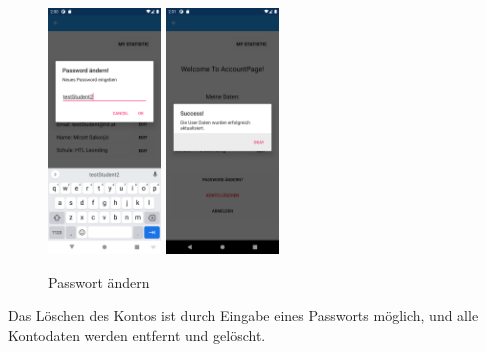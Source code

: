 \begin{figure}[h]
    \begin{center}
    \includegraphics[width=3cm]{pics/Xamarin Student/21.png}\hfill
    \includegraphics[width=3cm]{pics/Xamarin Student/22.png}
    \caption[MyAccount]{Passwort ändern}
    \end{center}
\end{figure}
\newpage
Das Löschen des Kontos ist durch Eingabe eines Passworts möglich, und alle Kontodaten werden entfernt und gelöscht.
